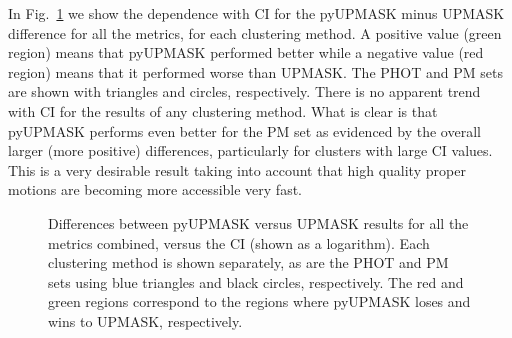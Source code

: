 \documentclass{aa}
\begin{document}
 In Fig.~\ref{fig:CIdelta} we show the dependence with CI for the pyUPMASK
 minus UPMASK difference for all the metrics, for each clustering method. A
 positive value (green region) means that pyUPMASK performed better while a
 negative value (red region) means that it performed worse than UPMASK. The
 PHOT and PM sets are shown with triangles and circles, respectively.
 There is no apparent trend with CI for the results of any clustering method.
 What is clear is that pyUPMASK performs even better for the PM set as
 evidenced by the overall larger (more positive) differences, particularly for
 clusters with large CI values. This is a very desirable result taking into
 account that high quality proper motions are becoming more accessible very
 fast.\\

 \begin{figure}
 \caption{Differences between pyUPMASK versus UPMASK results for all the
 metrics combined, versus the CI (shown as a logarithm). Each clustering method
 is shown separately, as are the PHOT and PM sets using blue triangles and
 black circles, respectively. The red and green regions correspond to the
 regions where pyUPMASK loses and wins to UPMASK, respectively.}
 \label{fig:CIdelta}
 \end{figure}
\end{document}
